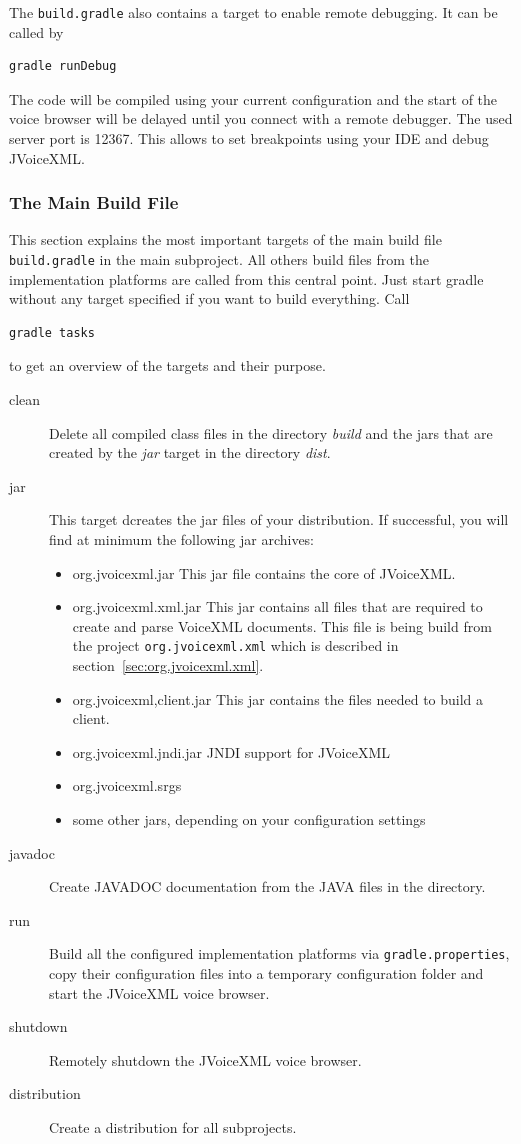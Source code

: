 \documentclass[11pt,a4paper]{article}
\begin{document}
The \texttt{build.gradle} also contains a target to enable remote
debugging. It can be called by
\begin{lstlisting}
gradle runDebug
\end{lstlisting}
The code will be compiled using your current configuration and the start of the
voice browser will be delayed until you connect with a remote debugger. The
used server port is 12367. This allows to set breakpoints using your IDE and
debug JVoiceXML.

\subsubsection{The Main Build File}
\label{sec:main-build-file}

This section explains the most important targets of the main build file
\texttt{build.gradle} in the main subproject. All others build files from the
implementation platforms
are called from this central point. Just start gradle without any target specified
if you want to build everything. Call
\begin{lstlisting}
gradle tasks
\end{lstlisting}
to get an overview of the targets and their purpose.

\begin{description}
\item[clean]
Delete all compiled class files in the directory \emph{build}
and the jars that are created by the \emph{jar} target in the directory 
\emph{dist}.

\item[jar]
This target dcreates the jar files of your distribution.
If successful, you will find at minimum the following jar archives:
\begin{itemize}
\item org.jvoicexml.jar This jar file contains the core of JVoiceXML.
\item org.jvoicexml.xml.jar This jar contains all files that are required
to create and parse VoiceXML documents. This file is being build from the
project \texttt{org.jvoicexml.xml} which is described in
section~\ref{sec:org.jvoicexml.xml}.
\item org.jvoicexml,client.jar This jar contains the files needed to build
a client.
\item org.jvoicexml.jndi.jar JNDI support for JVoiceXML
\item org.jvoicexml.srgs
\item some other jars, depending on your configuration settings
\end{itemize}

\item[javadoc]
Create JAVADOC documentation from the JAVA files in the directory.
\item[run] Build all the configured implementation platforms
via \texttt{gradle.properties}, copy their configuration files into a
temporary configuration folder and start the JVoiceXML voice browser.
\item[shutdown] Remotely shutdown the JVoiceXML voice browser.
\item[distribution] Create a distribution for all subprojects.
\end{description}
\end{document}
